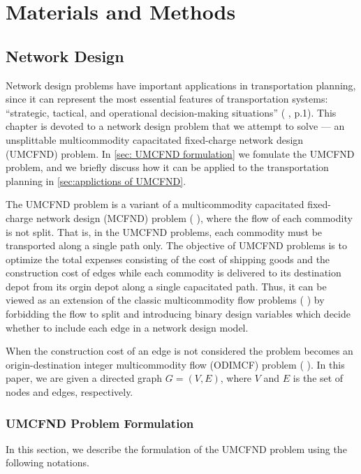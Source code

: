 \part{Materials and Methods}
\chapter{Network Design}
\label{chap:Network Design}
\vspace{1cm}

Network design problems have important applications in transportation planning, since it can represent the most essential features of transportation systems: ``strategic, tactical, and operational decision-making situations'' (\citeauthor{magnanti1984} \cite{magnanti1984}, p.1). This chapter is devoted to a network design problem that we attempt to solve --- an unsplittable multicommodity capacitated fixed-charge network design (UMCFND) problem. In \autoref{sec: UMCFND formulation} we fomulate the UMCFND problem, and we briefly discuss how it can be applied to the  transportation planning in \autoref{sec:applictions of UMCFND}.

The UMCFND problem is a variant of a multicommodity capacitated fixed-charge network design (MCFND) problem (\citeauthor{gendron1994} \cite{gendron1994}), where the flow of each commodity is not split. That is, in the UMCFND problems, each commodity must be transported along a single path only. The objective of UMCFND problems is to optimize the total expenses consisting of the cost of shipping goods and the construction cost of edges while each commodity is delivered to its destination depot from its orgin depot along a single capacitated path. Thus, it can be viewed as an extension of the classic multicommodity flow problems (\citeauthor{ahujia1993network} \cite{ahujia1993network}) by forbidding the flow to split and introducing binary design variables which decide whether to include each edge in a network design model.

When the construction cost of an edge is not considered the problem becomes an origin-destination integer multicommodity flow (ODIMCF) problem (\citeauthor{barnhart2000using} \cite{barnhart2000using}). In this paper, we are given a directed graph $G = (V, E)$, where $V$ and $E$ is the set of nodes and edges, respectively.

\section{UMCFND Problem Formulation}
\label{sec: UMCFND formulation}
In this section, we describe the formulation of the UMCFND problem using the following notations.
